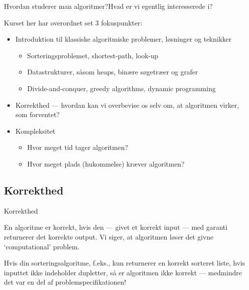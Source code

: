 \documentclass{beamer}
\begin{document}
\begin{frame}{Hvordan studerer man algoritmer?}{Hvad er vi egentlig
    interesserede i?}

    Kurset her har overordnet set 3 fokuspunkter:

    \pause
    \begin{itemize}
        \item Introduktion til klassiske algoritmiske problemer, løsninger og
            teknikker 
            \begin{itemize}
                \item Sorteringsproblemet, shortest-path, look-up
                \item Datastrukturer, såsom heaps, binære søgetræer og grafer
                \item Divide-and-conquer, greedy algorithms, dynamic programming
            \end{itemize}
        \pause
        \medskip
        \item Korrekthed --- hvordan kan vi overbevise os selv om, at algoritmen
            virker, som forventet?
        \pause
        \medskip
        \item Kompleksitet
            \begin{itemize}
                \item Hvor meget \alert{tid} tager algoritmen?
                \item Hvor meget \alert{plads} (hukommelse) kræver algoritmen?
            \end{itemize}
    \end{itemize}

\end{frame}

\subsection{Korrekthed}

\begin{frame}{Korrekthed}

    \begin{definition}[Korrekthed]
        En algoritme er \alert{korrekt}, hvis den --- givet et korrekt input ---
        med garanti returnerer det korrekte output. Vi siger, at algoritmen
        \alert{løser} det givne `computational' problem.
    \end{definition}

    \pause
    Hvis din sorteringsalgoritme, f.eks., kun returnerer en korrekt sorteret
    liste, hvis inputtet ikke indeholder dupletter, så er algoritmen ikke
    korrekt --- medmindre det var en del af problemspecifikationen!
    
\end{frame}
\end{document}
